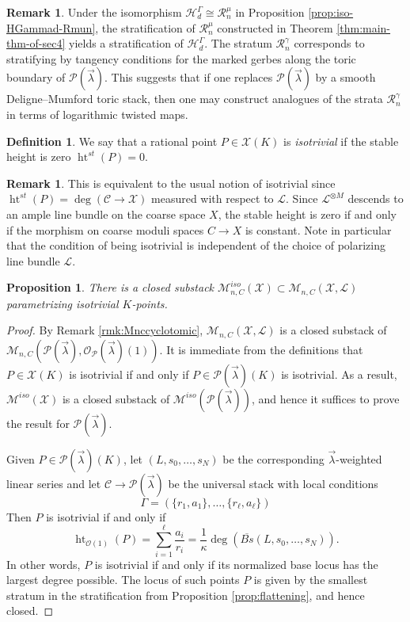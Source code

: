 \documentclass[a4paper,12pt]{amsart}
\newtheorem{prop}[thm]{Proposition}
\theoremstyle{definition}
\newtheorem{defn}[thm]{Definition}
\newtheorem{rmk}[thm]{Remark}
\newcommand{\cX}{\mathcal{X}}
\newcommand{\cO}{\mathcal{O}}
\newcommand{\cC}{\mathcal{C}}
\newcommand{\cL}{\mathcal{L}}
\newcommand{\cH}{\mathcal{H}}
\newcommand{\cR}{\mathcal{R}}
\newcommand{\cM}{\mathcal{M}}
\DeclareMathOperator{\height}{ht}
\newcommand{\Pcv}{\mathcal{P}(\vec{\lambda})}
\newcommand{\lambdavec}{{\vec{\lambda}}}
\begin{document}
	\begin{rmk}\label{rem:log}
		Under the isomorphism $\cH^{\Gamma}_d\cong\cR^{\mu}_n$ in Proposition \eqref{prop:iso-HGammad-Rmun}, the stratification of $\cR^{\mu}_n$ constructed in Theorem \ref{thm:main-thm-of-sec4} yields a stratification of $\cH^{\Gamma}_d$. The stratum $\cR^\gamma_n$ corresponds to stratifying by tangency conditions for the marked gerbes along the toric boundary of $\Pcv$. This suggests that if one replaces $\Pcv$ by a smooth Deligne--Mumford toric stack, then one may construct analogues of the strata $\cR^\gamma_n$ in terms of logarithmic twisted maps.
	\end{rmk}
	
	\begin{defn}
		We say that a rational point $P \in \cX(K)$ is \emph{isotrivial} if the stable height is zero $\height^{st}(P) = 0$. 
	\end{defn}
	\begin{rmk}
		This is equivalent to the usual notion of isotrivial since $\height^{st}(P) = \deg(\cC \to \cX)$ measured with respect to $\cL$. Since $\cL^{\otimes M}$ descends to an ample line bundle on the coarse space $X$, the stable height is zero if and only if the morphism on coarse moduli spaces $C \to X$ is constant. Note in particular that the condition of being isotrivial is independent of the choice of polarizing line bundle $\cL$. 
	\end{rmk}
	
	\begin{prop} There is a closed substack $\cM_{n,C}^{iso}(\cX) \subset \cM_{n,C}(\cX, \cL)$ parametrizing isotrivial $K$-points. 
	\end{prop}
	\begin{proof}
		By Remark \ref{rmk:Mnccyclotomic}, $\cM_{n,C}(\cX,\cL)$ is a closed substack of $\cM_{n,C}(\Pcv,\cO_\Pcv(1))$. It is immediate from the definitions that $P\in\cX(K)$ is isotrivial if and only if $P\in\Pcv(K)$ is isotrivial. As a result, $\cM^{iso}(\cX)$ is a closed substack of $\cM^{iso}(\Pcv)$, and hence it suffices to prove the result for $\Pcv$.
		
		Given $P\in\Pcv(K)$, let $(L, s_0, \ldots, s_N)$ be the corresponding $\lambdavec$-weighted linear series and let $\cC\to\Pcv$ be the universal stack with local conditions $$\Gamma=(\{r_1,a_1\},\dots,\{r_\ell,a_\ell\})$$ Then $P$ is isotrivial if and only if 
		$$
		\height_{\cO(1)}(P)=\sum_{i=1}^\ell\frac{a_i}{r_i}=\frac{1}{\kappa}\deg(\overline{Bs}(L, s_0, \ldots, s_N)).
		$$
		In other words, $P$ is isotrivial if and only if its normalized base locus has the largest degree possible. The locus of such points $P$ is given by the smallest stratum in the stratification from Proposition \ref{prop:flattening}, and hence closed.
	\end{proof}
	
\end{document}

